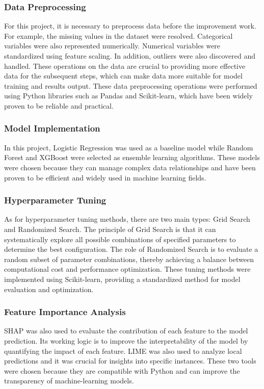 \documentclass[conference]{IEEEtran}
\begin{document}
\subsubsection{Data Preprocessing}
For this project, it is necessary to preprocess data before the improvement work. For example, the missing values in the dataset were resolved. Categorical variables were also represented numerically. Numerical variables were standardized using feature scaling. In addition, outliers were also discovered and handled. These operations on the data are crucial to providing more effective data for the subsequent steps, which can make data more suitable for model training and results output. These data preprocessing operations were performed using Python libraries such as Pandas and Scikit-learn, which have been widely proven to be reliable and practical. 


\subsubsection{Model Implementation}

In this project, Logistic Regression was used as a baseline model while Random Forest and XGBoost were selected as ensemble learning algorithms. These models were chosen because they can manage complex data relationships and have been proven to be efficient and widely used in machine learning fields.


\subsubsection{Hyperparameter Tuning}

As for hyperparameter tuning methods, there are two main types: Grid Search and Randomized Search. The principle of Grid Search is that it can systematically explore all possible combinations of specified parameters to determine the best configuration. The role of Randomized Search is to evaluate a random subset of parameter combinations, thereby achieving a balance between computational cost and performance optimization. These tuning methods were implemented using Scikit-learn, providing a standardized method for model evaluation and optimization.

\subsubsection{Feature Importance Analysis}
SHAP was also used to evaluate the contribution of each feature to the model prediction. Its working logic is to improve the interpretability of the model by quantifying the impact of each feature. LIME was also used to analyze local predictions and it was crucial for insights into specific instances. These two tools were chosen because they are compatible with Python and can improve the transparency of machine-learning models.
\end{document}
